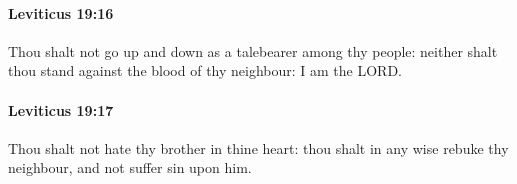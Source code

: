 		\paragraph{Leviticus 19:16} %
			\label{LEVITICUS-19-16}

			Thou shalt not go up and down as a talebearer among thy people: neither shalt thou stand against the blood of thy neighbour: I am the LORD.


		\paragraph{Leviticus 19:17} %
			\label{LEVITICUS-19-17}

			Thou shalt not hate thy brother in thine heart: thou shalt in any wise rebuke thy neighbour, and not suffer sin upon him.


